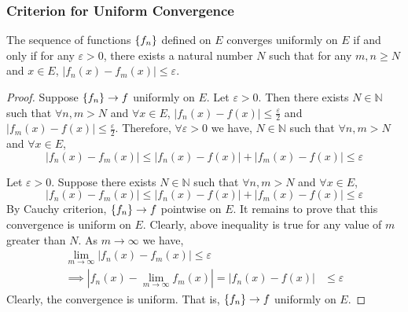 \subsubsection{Criterion for Uniform Convergence}
\begin{theorem}
	The sequence of functions $\left\{f_n\right\}$ defined on $E$ converges uniformly on $E$ if and only if for any $\varepsilon > 0$, there exists a natural number $N$ such that for any $m,n \ge N$ and $x \in E$, $|f_n(x)-f_m(x)| \le \varepsilon$.
\end{theorem}
\begin{proof}
	Suppose $\left\{f_n\right\} \to f$ uniformly on $E$.
	Let $\varepsilon > 0$.
	Then there exists $N \in \mathbb{N}$ such that $\forall n,m > N$ and $\forall x \in E$, $|f_n(x) - f(x)| \le \frac{\varepsilon}{2}$ and $|f_m(x)-f(x)| \le \frac{\varepsilon}{2}$.
	Therefore, $\forall \varepsilon > 0$ we have, $N \in \mathbb{N}$ such that $\forall n,m > N$ and $\forall x \in E$,
	\[ |f_n(x) - f_m(x)| \le |f_n(x)-f(x)| + |f_m(x)-f(x)| \le \varepsilon \]

	Let $\varepsilon > 0$.
	Suppose there exists $N \in \mathbb{N}$ such that $\forall n,m > N$ and $\forall x \in E$,
	\[ |f_n(x) - f_m(x)| \le |f_n(x)-f(x)| + |f_m(x)-f(x)| \le \varepsilon \]
	By Cauchy criterion, $\left\{f_n\right\} \to f$ pointwise on $E$.
	It remains to prove that this convergence is uniform on $E$.
	Clearly, above inequality is true for any value of $m$ greater than $N$.
	As $m \to \infty$ we have,
	\begin{align*}
		\lim_{m \to \infty} |f_n(x) - f_m(x)|  \le \varepsilon \\
		\implies \left|f_n(x) - \lim_{m \to \infty} f_m(x)\right| = |f_n(x) - f(x) | & \le \varepsilon
	\end{align*}
	Clearly, the convergence is uniform.
	That is, $\left\{f_n\right\} \to f$ uniformly on $E$.
\end{proof}

